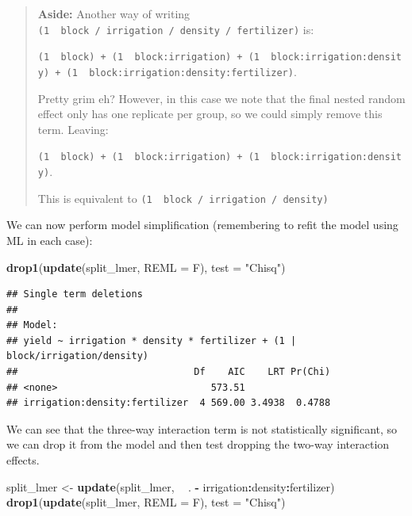 \documentclass[]{book}
\newenvironment{Shaded}{\begin{snugshade}}{\end{snugshade}}
\newcommand{\KeywordTok}[1]{\textcolor[rgb]{0.13,0.29,0.53}{\textbf{#1}}}
\newcommand{\DataTypeTok}[1]{\textcolor[rgb]{0.13,0.29,0.53}{#1}}
\newcommand{\StringTok}[1]{\textcolor[rgb]{0.31,0.60,0.02}{#1}}
\newcommand{\OperatorTok}[1]{\textcolor[rgb]{0.81,0.36,0.00}{\textbf{#1}}}
\newcommand{\NormalTok}[1]{#1}
\theoremstyle{definition}
\theoremstyle{definition}
\theoremstyle{definition}
\theoremstyle{remark}
\begin{document}
\begin{quote}
\textbf{Aside:} Another way of writing
\texttt{(1\ \textbar{}\ block\ /\ irrigation\ /\ density\ /\ fertilizer)}
is:

\texttt{(1\ \textbar{}\ block)\ +\ (1\ \textbar{}\ block:irrigation)\ +\ (1\ \textbar{}\ block:irrigation:density)\ +\ (1\ \textbar{}\ block:irrigation:density:fertilizer)}.

Pretty grim eh? However, in this case we note that the final nested
random effect only has one replicate per group, so we could simply
remove this term. Leaving:

\texttt{(1\ \textbar{}\ block)\ +\ (1\ \textbar{}\ block:irrigation)\ +\ (1\ \textbar{}\ block:irrigation:density)}.

This is equivalent to
\texttt{(1\ \textbar{}\ block\ /\ irrigation\ /\ density)}
\end{quote}

We can now perform model simplification (remembering to refit the model
using ML in each case):

\begin{Shaded}
\begin{Highlighting}[]
\KeywordTok{drop1}\NormalTok{(}\KeywordTok{update}\NormalTok{(split_lmer, }\DataTypeTok{REML =}\NormalTok{ F), }\DataTypeTok{test =} \StringTok{"Chisq"}\NormalTok{)}
\end{Highlighting}
\end{Shaded}

\begin{verbatim}
## Single term deletions
## 
## Model:
## yield ~ irrigation * density * fertilizer + (1 | block/irrigation/density)
##                               Df    AIC    LRT Pr(Chi)
## <none>                           573.51               
## irrigation:density:fertilizer  4 569.00 3.4938  0.4788
\end{verbatim}

We can see that the three-way interaction term is not statistically
significant, so we can drop it from the model and then test dropping the
two-way interaction effects.

\begin{Shaded}
\begin{Highlighting}[]
\NormalTok{split_lmer <-}\StringTok{ }\KeywordTok{update}\NormalTok{(split_lmer, }\OperatorTok{~}\StringTok{ }\NormalTok{. }\OperatorTok{-}\StringTok{ }\NormalTok{irrigation}\OperatorTok{:}\NormalTok{density}\OperatorTok{:}\NormalTok{fertilizer)}
\KeywordTok{drop1}\NormalTok{(}\KeywordTok{update}\NormalTok{(split_lmer, }\DataTypeTok{REML =}\NormalTok{ F), }\DataTypeTok{test =} \StringTok{"Chisq"}\NormalTok{)}
\end{Highlighting}
\end{Shaded}
\end{document}
